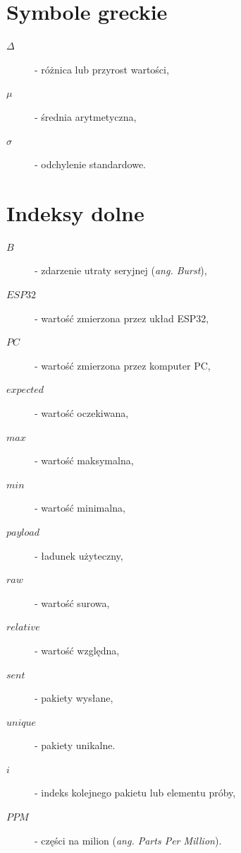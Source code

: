 \section*{Symbole greckie}

\begin{description}
    \item[$\Delta$] - różnica lub przyrost wartości, %
    \item[$\mu$] - średnia arytmetyczna, %
    \item[$\sigma$] - odchylenie standardowe. %
\end{description}

\section*{Indeksy dolne}

\begin{description}
    \item[$B$] - zdarzenie utraty seryjnej (\textit{ang. Burst}), %
    \item[$ESP32$] - wartość zmierzona przez układ ESP32, %
    \item[$PC$] - wartość zmierzona przez komputer PC, %
    \item[$expected$] - wartość oczekiwana, %
    \item[$max$] - wartość maksymalna, %
    \item[$min$] - wartość minimalna, %
    \item[$payload$] - ładunek użyteczny, %
    \item[$raw$] - wartość surowa, %
    \item[$relative$] - wartość względna, %
    \item[$sent$] - pakiety wysłane, %
    \item[$unique$] - pakiety unikalne. %
    \item[$i$] - indeks kolejnego pakietu lub elementu próby, %
    \item[$PPM$] - części na milion (\textit{ang. Parts Per Million}). %
\end{description}
